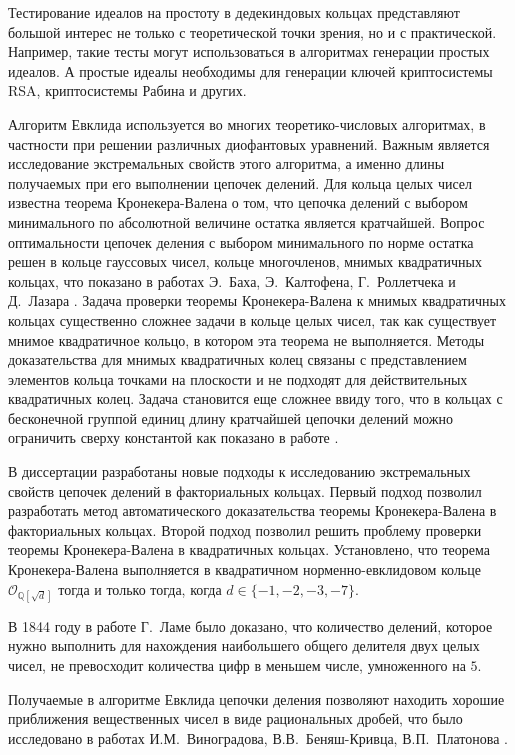 \documentclass[_00_dissertation.tex]{subfiles}
\begin{document}
Тестирование идеалов на простоту в дедекиндовых кольцах представляют большой интерес не только с теоретической точки зрения, но и с практической.
Например, такие тесты могут использоваться в алгоритмах генерации простых идеалов.
А простые идеалы необходимы для генерации ключей криптосистемы RSA, криптосистемы Рабина и других.

Алгоритм Евклида используется во многих теоретико-числовых алгоритмах, в частности при решении различных диофантовых уравнений.
Важным является исследование экстремальных свойств этого алгоритма, а именно длины получаемых при его выполнении цепочек делений.
Для кольца целых чисел известна теорема Кронекера-Валена о том, что цепочка делений с выбором минимального по абсолютной величине остатка является кратчайшей.
Вопрос оптимальности цепочек деления с выбором минимального по норме остатка решен в кольце гауссовых чисел, кольце многочленов, мнимых квадратичных кольцах, что показано в работах Э.~Баха, Э.~Калтофена, Г.~Роллетчека и Д.~Лазара \cite{source:Bach_Algorithmic_number_theory, source:Kaltofen, source:Lazard, source:Rolletschek_1986, source:Rolletschek_1990}.
Задача проверки теоремы Кронекера-Валена к мнимых квадратичных кольцах существенно сложнее задачи в кольце целых чисел, так как существует мнимое квадратичное кольцо, в котором эта теорема не выполняется.
Методы доказательства для мнимых квадратичных колец связаны с представлением элементов кольца точками на плоскости и не подходят для действительных квадратичных колец.
Задача становится еще сложнее ввиду того, что в кольцах с бесконечной группой единиц длину кратчайшей цепочки делений можно ограничить сверху константой как показано в работе \cite{source:Cooke}.

В диссертации разработаны новые подходы к исследованию экстремальных свойств цепочек делений в факториальных кольцах.
Первый подход позволил разработать метод автоматического доказательства теоремы Кронекера-Валена в факториальных кольцах.
Второй подход позволил решить проблему проверки теоремы Кронекера-Валена в квадратичных кольцах.
Установлено, что теорема Кронекера-Валена выполняется в квадратичном норменно-евклидовом кольце $\mathcal{O}_{\mathbb{Q}[\sqrt{d}]}$ тогда и только тогда, когда $d \in \{-1, -2, -3, -7\}$.

В 1844 году в работе Г.~Ламе было доказано, что количество делений, которое нужно выполнить для нахождения наибольшего общего делителя двух целых чисел, не превосходит количества цифр в меньшем числе, умноженного на $5$.

Получаемые в алгоритме Евклида цепочки деления позволяют находить хорошие приближения вещественных чисел в виде рациональных дробей, что было исследовано в работах И.М.~Виноградова,  В.В.~Беняш-Кривца, В.П.~Платонова \cite{source:Benyash-Krivets_1, source:Benyash-Krivets_2, source:Vinogradov}.
\end{document}
